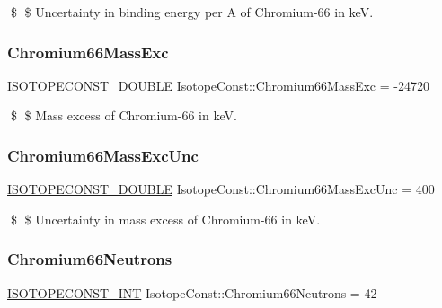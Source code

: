 \$ \$ Uncertainty in binding energy per A of Chromium-\/66 in keV. \mbox{\label{group___isotope_const-_chromium-_cr66_gaf7d7f9e00f97118051a957cf28a56472}} 
\subsubsection{\texorpdfstring{Chromium66\+Mass\+Exc}{Chromium66MassExc}}
{\footnotesize\ttfamily \mbox{\hyperlink{group___isotope_const-_macros_ga8f45a7272ce02c0b4c65c44636ed719a}{I\+S\+O\+T\+O\+P\+E\+C\+O\+N\+S\+T\+\_\+\+D\+O\+U\+B\+LE}} Isotope\+Const\+::\+Chromium66\+Mass\+Exc = -\/24720}

\$ \$ Mass excess of Chromium-\/66 in keV. \mbox{\label{group___isotope_const-_chromium-_cr66_ga78ee816d67adf4a1e8e260c99c8456bb}} 
\subsubsection{\texorpdfstring{Chromium66\+Mass\+Exc\+Unc}{Chromium66MassExcUnc}}
{\footnotesize\ttfamily \mbox{\hyperlink{group___isotope_const-_macros_ga8f45a7272ce02c0b4c65c44636ed719a}{I\+S\+O\+T\+O\+P\+E\+C\+O\+N\+S\+T\+\_\+\+D\+O\+U\+B\+LE}} Isotope\+Const\+::\+Chromium66\+Mass\+Exc\+Unc = 400}

\$ \$ Uncertainty in mass excess of Chromium-\/66 in keV. \mbox{\label{group___isotope_const-_chromium-_cr66_ga59b4d7ef51a7fb9dbfbbc164350785cc}} 
\subsubsection{\texorpdfstring{Chromium66\+Neutrons}{Chromium66Neutrons}}
{\footnotesize\ttfamily \mbox{\hyperlink{group___isotope_const-_macros_ga5f18360b3e99483a35c32d789e62621c}{I\+S\+O\+T\+O\+P\+E\+C\+O\+N\+S\+T\+\_\+\+I\+NT}} Isotope\+Const\+::\+Chromium66\+Neutrons = 42}


